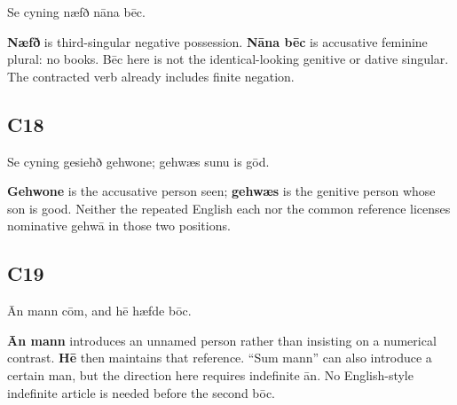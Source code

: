 \par\begin{minipage}{\linewidth}\raggedright
Se cyning næfð nāna bēc.

\textbf{Næfð} is third-singular negative possession. \textbf{Nāna bēc} is accusative feminine plural: no books. Bēc here is not the identical-looking genitive or dative singular. The contracted verb already includes finite negation.

\end{minipage}\par\addvspace{4pt}

\subsection*{C18}

\par\begin{minipage}{\linewidth}\raggedright
Se cyning gesiehð gehwone; gehwæs sunu is gōd.

\textbf{Gehwone} is the accusative person seen; \textbf{gehwæs} is the genitive person whose son is good. Neither the repeated English each nor the common reference licenses nominative gehwā in those two positions.

\end{minipage}\par\addvspace{4pt}

\subsection*{C19}

\par\begin{minipage}{\linewidth}\raggedright
Ān mann cōm, and hē hæfde bōc.

\textbf{Ān mann} introduces an unnamed person rather than insisting on a numerical contrast. \textbf{Hē} then maintains that reference. “Sum mann” can also introduce a certain man, but the direction here requires indefinite ān. No English-style indefinite article is needed before the second bōc.

\end{minipage}\par\addvspace{4pt}

